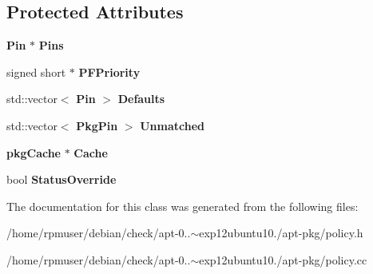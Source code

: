 \subsection*{\-Protected \-Attributes}
\begin{DoxyCompactItemize}
\item 
{\bf \-Pin} $\ast$ {\bfseries \-Pins}\label{classpkgPolicy_ab6e547b6c94c8b367dacd2641198822c}

\item 
signed short $\ast$ {\bfseries \-P\-F\-Priority}\label{classpkgPolicy_afa4b38370d0caa9db2e8573824943fbe}

\item 
std\-::vector$<$ {\bf \-Pin} $>$ {\bfseries \-Defaults}\label{classpkgPolicy_a2261f88b5cea770400db122518897cb1}

\item 
std\-::vector$<$ {\bf \-Pkg\-Pin} $>$ {\bfseries \-Unmatched}\label{classpkgPolicy_aea39fd6037d54b0feda46e49a35cfa23}

\item 
{\bf pkg\-Cache} $\ast$ {\bfseries \-Cache}\label{classpkgPolicy_a200f99ff6c297b73a2e9302d95ca7a87}

\item 
bool {\bfseries \-Status\-Override}\label{classpkgPolicy_ad3b12d92507111c100a4821e02f6a30c}

\end{DoxyCompactItemize}


\-The documentation for this class was generated from the following files\-:\begin{DoxyCompactItemize}
\item 
/home/rpmuser/debian/check/apt-\/0..$\sim$exp12ubuntu10./apt-\/pkg/policy.\-h\item 
/home/rpmuser/debian/check/apt-\/0..$\sim$exp12ubuntu10./apt-\/pkg/policy.\-cc\end{DoxyCompactItemize}
